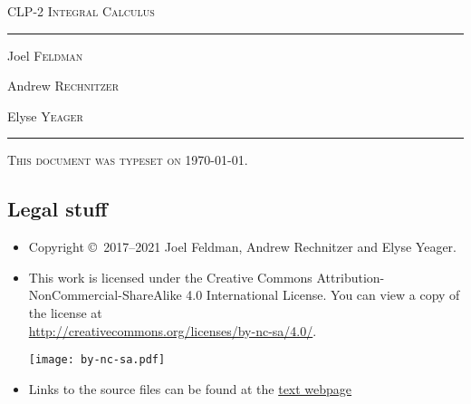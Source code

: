 \documentclass[12pt,letterpaper, openany]{book}
\begin{document}
\setcounter{page}{0}

\begin{titlepage}
\begin{center}
\textsc{\LARGE
CLP-2 Integral Calculus
}\\[2ex]

\vspace{5ex}
\hrule
\vspace{5ex}

\begin{minipage}[t]{0.3\textwidth} \begin{flushleft}
\large Joel \textsc{Feldman}
\end{flushleft} \end{minipage}%
\begin{minipage}[t]{0.3\textwidth} \begin{flushleft}
\large Andrew \textsc{Rechnitzer}
\end{flushleft} \end{minipage}%
\begin{minipage}[t]{0.3\textwidth} \begin{flushright}
\large Elyse \textsc{Yeager}
\end{flushright} \end{minipage}%
\end{center}
\vspace{2ex}
\hrule

\vfill
\textsc{This document was typeset on \today.}
\end{titlepage}

\subsection*{Legal stuff}
\begin{itemize}
 \item Copyright \copyright\ 2017--2021 Joel Feldman, Andrew Rechnitzer and Elyse Yeager.
\item This work is licensed under the
Creative Commons Attribution-NonCommercial-ShareAlike 4.0 International
License. You can view a copy of the license at \\
\url{http://creativecommons.org/licenses/by-nc-sa/4.0/}.
\begin{center}
 \texttt{[image: by-nc-sa.pdf]}
\end{center}
\item Links to the source files can be found at the \href{http://www.math.ubc.ca/~CLP/index.html}{text webpage}
\end{itemize}


\frontmatter


\tableofcontents

\mainmatter




\appendix






\end{document}
